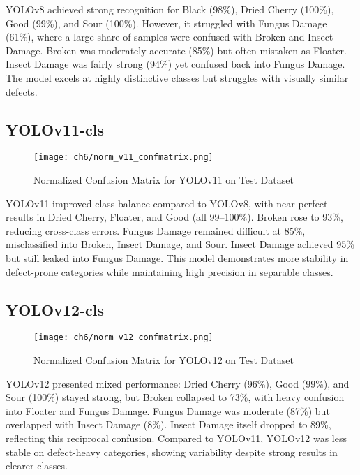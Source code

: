 YOLOv8 achieved strong recognition for Black (98\%), Dried Cherry (100\%), Good (99\%), and Sour (100\%). However, it struggled with Fungus Damage (61\%), where a large share of samples were confused with Broken and Insect Damage. Broken was moderately accurate (85\%) but often mistaken as Floater. Insect Damage was fairly strong (94\%) yet confused back into Fungus Damage. The model excels at highly distinctive classes but struggles with visually similar defects.

\subsection{YOLOv11-cls}

\begin{figure}[H]
    \centering
    \texttt{[image: ch6/norm\_v11\_confmatrix.png]} %
    \caption{Normalized Confusion Matrix for YOLOv11 on Test Dataset}
    \label{fig:yolov11_conf_matrix}
\end{figure}

YOLOv11 improved class balance compared to YOLOv8, with near-perfect results in Dried Cherry, Floater, and Good (all 99–100\%). Broken rose to 93\%, reducing cross-class errors. Fungus Damage remained difficult at 85\%, misclassified into Broken, Insect Damage, and Sour. Insect Damage achieved 95\% but still leaked into Fungus Damage. This model demonstrates more stability in defect-prone categories while maintaining high precision in separable classes.

\subsection{YOLOv12-cls}

\begin{figure}[H]
    \centering
    \texttt{[image: ch6/norm\_v12\_confmatrix.png]} %
    \caption{Normalized Confusion Matrix for YOLOv12 on Test Dataset}
    \label{fig:yolov12_conf_matrix}
\end{figure}

YOLOv12 presented mixed performance: Dried Cherry (96\%), Good (99\%), and Sour (100\%) stayed strong, but Broken collapsed to 73\%, with heavy confusion into Floater and Fungus Damage. Fungus Damage was moderate (87\%) but overlapped with Insect Damage (8\%). Insect Damage itself dropped to 89\%, reflecting this reciprocal confusion. Compared to YOLOv11, YOLOv12 was less stable on defect-heavy categories, showing variability despite strong results in clearer classes.

